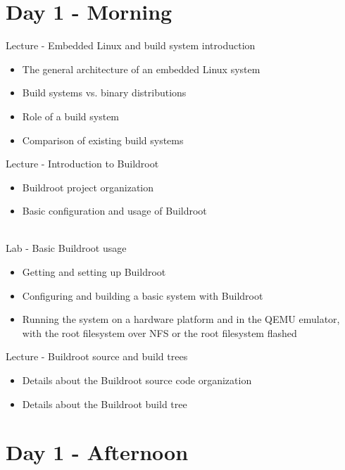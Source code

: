 \documentclass[a4paper,12pt,obeyspaces,spaces,hyphens]{article}
\begin{document}
\section{Day 1 - Morning}

\feagendatwocolumn
{Lecture - Embedded Linux and build system introduction}
{
  \begin{itemize}
  \item The general architecture of an embedded Linux system
  \item Build systems vs. binary distributions
  \item Role of a build system
  \item Comparison of existing build systems
  \end{itemize}
}
{Lecture - Introduction to Buildroot}
{
  \begin{itemize}
  \item Buildroot project organization
  \item Basic configuration and usage of Buildroot
  \end{itemize}
}
\\
\feagendatwocolumn
{Lab - Basic Buildroot usage}
{
  \begin{itemize}
  \item Getting and setting up Buildroot
  \item Configuring and building a basic system with Buildroot
  \item Running the system on a hardware platform and in the QEMU
    emulator, with the root filesystem over NFS or the root filesystem
    flashed
  \end{itemize}
}
{Lecture - Buildroot source and build trees}
{
  \begin{itemize}
  \item Details about the Buildroot source code organization
  \item Details about the Buildroot build tree
  \end{itemize}
}

\section{Day 1 - Afternoon}
\end{document}
